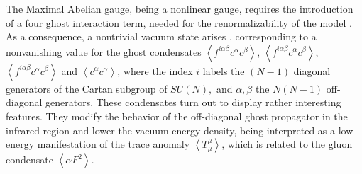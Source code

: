 \documentclass[a4paper,12pt]{article}
\begin{document}
The Maximal Abelian gauge, being a nonlinear gauge, requires the
introduction of a four ghost interaction term, needed for the
renormalizability of the model \cite{mlp,f}. As a consequence, a nontrivial
vacuum state arises \cite{ms,k,sp,dd}, corresponding to a nonvanishing value
for the ghost condensates $\left\langle f^{i\alpha \beta }c^{\alpha
}c^{\beta }\right\rangle $, $\left\langle f^{i\alpha \beta }\overline{c}%
^{\alpha }\overline{c}^{\beta }\right\rangle $, $\left\langle f^{i\alpha
\beta }c^{\alpha }\overline{c}^{\beta }\right\rangle $ and $\left\langle 
\overline{c}^{\alpha }c^{\alpha }\right\rangle $, where the index $i$ labels
the $(N-1)$ diagonal generators of the Cartan subgroup of $SU(N),$ and $%
\alpha ,\beta $ the $N(N-1)$ off-diagonal generators. These condensates turn
out to display rather interesting features. They modify the behavior of the
off-diagonal ghost propagator in the infrared region \cite{ms,k,sp} and
lower the vacuum energy density, being interpreted as a low-energy
manifestation of the trace anomaly $\left\langle T_{\mu }^{\mu
}\right\rangle $, which is related to the gluon condensate $\left\langle
\alpha F^{2}\right\rangle $.
\end{document}
